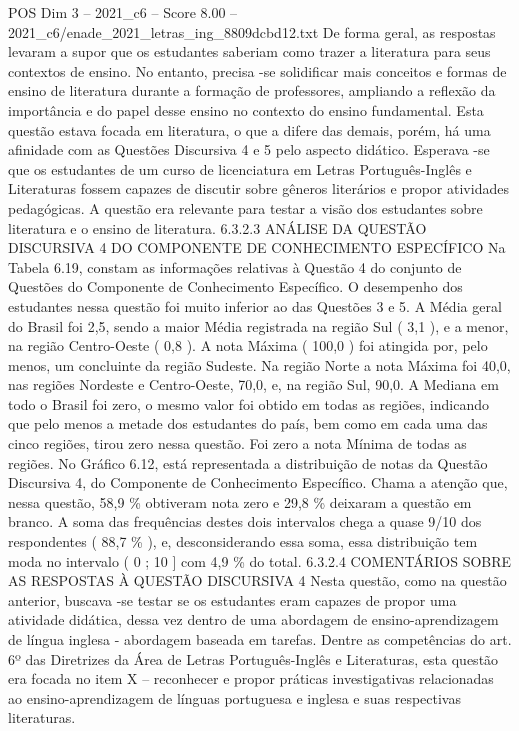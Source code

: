 \begin{textsample}{POS Dim 3 – 2021\_c6 – Score 8.00 – 2021\_c6/enade\_2021\_letras\_ing\_8809dcbd12.txt}
De forma geral, as respostas levaram a supor que os estudantes saberiam como trazer a literatura para seus contextos de ensino.
No entanto, precisa -se solidificar mais conceitos e formas de ensino de literatura durante a formação de professores, ampliando a reflexão da importância e do papel desse ensino no contexto do ensino fundamental.
Esta questão estava focada em literatura, o que a difere das demais, porém, há uma afinidade com as Questões Discursiva 4 e 5 pelo aspecto didático.
Esperava -se que os estudantes de um curso de licenciatura em Letras Português-Inglês e Literaturas fossem capazes de discutir sobre gêneros literários e propor atividades pedagógicas.
A questão era relevante para testar a visão dos estudantes sobre literatura e o ensino de literatura. 6.3.2.3 ANÁLISE DA QUESTÃO DISCURSIVA 4 DO COMPONENTE DE CONHECIMENTO ESPECÍFICO Na Tabela 6.19, constam as informações relativas à Questão 4 do conjunto de Questões do Componente de Conhecimento Específico.
O desempenho dos estudantes nessa questão foi muito inferior ao das Questões 3 e 5.
A Média geral do Brasil foi 2,5, sendo a maior Média registrada na região Sul ( 3,1 ), e a menor, na região Centro-Oeste ( 0,8 ).
A nota Máxima ( 100,0 ) foi atingida por, pelo menos, um concluinte da região Sudeste.
Na região Norte a nota Máxima foi 40,0, nas regiões Nordeste e Centro-Oeste, 70,0, e, na região Sul, 90,0.
A Mediana em todo o Brasil foi zero, o mesmo valor foi obtido em todas as regiões, indicando que pelo menos a metade dos estudantes do país, bem como em cada uma das cinco regiões, tirou zero nessa questão.
Foi zero a nota Mínima de todas as regiões.
No Gráfico 6.12, está representada a distribuição de notas da Questão Discursiva 4, do Componente de Conhecimento Específico.
Chama a atenção que, nessa questão, 58,9 \% obtiveram nota zero e 29,8 \% deixaram a questão em branco.
A soma das frequências destes dois intervalos chega a quase 9/10 dos respondentes ( 88,7 \% ), e, desconsiderando essa soma, essa distribuição tem moda no intervalo ( 0 ; 10 ] com 4,9 \% do total. 6.3.2.4 COMENTÁRIOS SOBRE AS RESPOSTAS À QUESTÃO DISCURSIVA 4 Nesta questão, como na questão anterior, buscava -se testar se os estudantes eram capazes de propor uma atividade didática, dessa vez dentro de uma abordagem de ensino-aprendizagem de língua inglesa - abordagem baseada em tarefas.
Dentre as competências do art. 6º das Diretrizes da Área de Letras Português-Inglês e Literaturas, esta questão era focada no item X – reconhecer e propor práticas investigativas relacionadas ao ensino-aprendizagem de línguas portuguesa e inglesa e suas respectivas literaturas.

\end{textsample}

